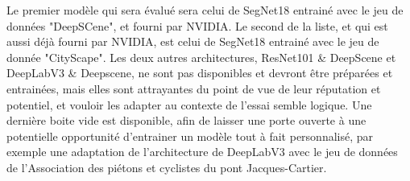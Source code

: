 ﻿\par Le premier modèle qui sera évalué sera celui de SegNet18 entrainé avec le jeu de données "DeepSCene", et fourni par NVIDIA. Le second de la liste, et qui est aussi déjà fourni par NVIDIA, est celui de SegNet18 entrainé avec le jeu de donnée "CityScape". Les deux autres architectures, ResNet101 \& DeepScene et DeepLabV3 \& Deepscene, ne sont pas disponibles et devront être préparées et entrainées, mais elles sont attrayantes du point de vue de leur réputation et potentiel, et vouloir les adapter au contexte de l'essai semble logique. Une dernière boite vide est disponible, afin de laisser une porte ouverte à une potentielle opportunité d'entrainer un modèle tout à fait personnalisé, par exemple une adaptation de l'architecture de DeepLabV3 avec le jeu de données de l'Association des piétons et cyclistes du pont Jacques-Cartier.